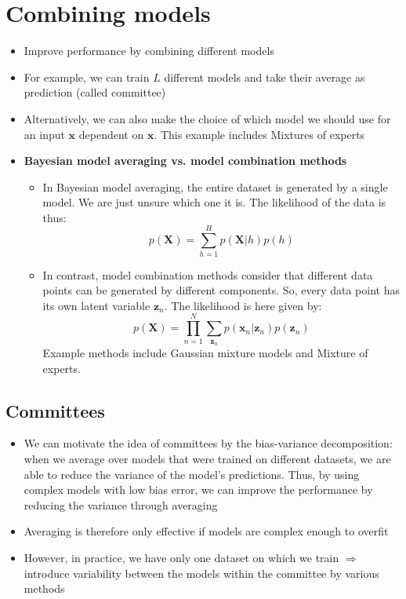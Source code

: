 \section{Combining models}
\begin{itemize}
	\item Improve performance by combining different models
	\item For example, we can train $L$ different models and take their average as prediction (called committee)
	\item Alternatively, we can also make the choice of which model we should use for an input $\bm{x}$ dependent on $\bm{x}$. This example includes Mixtures of experts
	\item \textbf{Bayesian model averaging vs. model combination methods}
	\begin{itemize}
		\item In Bayesian model averaging, the entire dataset is generated by a single model. We are just unsure which one it is. The likelihood of the data is thus:
		$$p(\bm{X}) = \sum_{h=1}^{H} p(\bm{X}|h)p(h)$$
		\item In contrast, model combination methods consider that different data points can be generated by different components. So, every data point has its own latent variable $\bm{z}_n$. The likelihood is here given by:
		$$p(\bm{X}) = \prod_{n=1}^{N}\sum_{\bm{z}_n} p(\bm{x}_n|\bm{z}_n)p(\bm{z}_n)$$
		Example methods include Gaussian mixture models and Mixture of experts.
	\end{itemize}
\end{itemize}
\subsection{Committees}
\begin{itemize}
	\item We can motivate the idea of committees by the bias-variance decomposition: when we average over models that were trained on different datasets, we are able to reduce the variance of the model's predictions. Thus, by using complex models with low bias error, we can improve the performance by reducing the variance through averaging
	\item Averaging is therefore only effective if models are complex enough to overfit
	\item However, in practice, we have only one dataset on which we train $\Rightarrow$ introduce variability between the models within the committee by various methods
\end{itemize}
